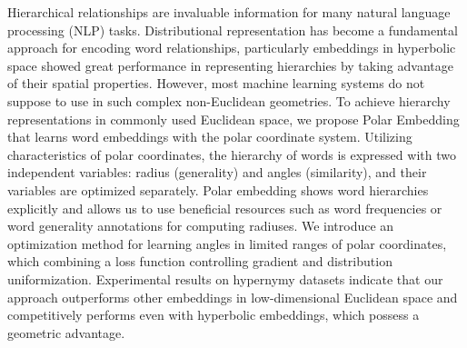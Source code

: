 Hierarchical relationships are invaluable information for many natural language processing (NLP) tasks. Distributional representation has become a fundamental approach for encoding word relationships, particularly embeddings in hyperbolic space showed great performance in representing hierarchies by taking advantage of their spatial properties. However, most machine learning systems do not suppose to use in such complex non-Euclidean geometries. To achieve hierarchy representations in commonly used Euclidean space, we propose Polar Embedding that learns word embeddings with the polar coordinate system. Utilizing characteristics of polar coordinates, the hierarchy of words is expressed with two independent variables: radius (generality) and angles (similarity), and their variables are optimized separately. Polar embedding shows word hierarchies explicitly and allows us to use beneficial resources such as word frequencies or word generality annotations for computing radiuses. We introduce an optimization method for learning angles in limited ranges of polar coordinates, which combining a loss function controlling gradient and distribution uniformization. Experimental results on hypernymy datasets indicate that our approach outperforms other embeddings in low-dimensional Euclidean space and competitively performs even with hyperbolic embeddings, which possess a geometric advantage.
